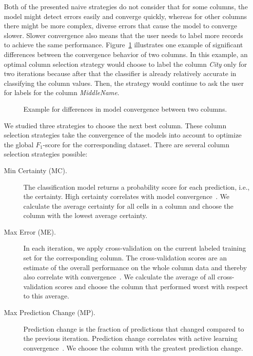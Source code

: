 Both of the presented naive strategies do not consider that for some columns, the model might detect errors easily and converge quickly, whereas for other columns there might be more complex, diverse errors that cause the model to converge slower. Slower convergence also means that the user needs to label more records to achieve the same performance. Figure~\ref{fig:column_progress} illustrates one example of significant differences between the convergence behavior of two columns. In this example, an optimal column selection strategy would choose to label the column \emph{City} only for two iterations because after that the classifier is already relatively accurate in classifying the column values. Then, the strategy would continue to ask the user for labels for the column \emph{MiddleName}.

\begin{figure}[H]
\centering

\caption{Example for differences in model convergence between two columns.} 
\label{fig:column_progress}
\end{figure}

We studied three strategies to choose the next best column. These column selection strategies take the convergence of the models into account to optimize the global $F_1$-score for the corresponding dataset.
There are several column selection strategies possible:

\begin{description}
  \item[Min Certainty (MC).] The classification model returns a probability score for each prediction, i.e., the certainty. High certainty correlates with model convergence~\cite{zhu2007active}. We calculate the average certainty for all cells in a column and choose the column with the lowest average certainty. 
  \item[Max Error (ME).] In each iteration, we apply cross-validation on the current labeled training set for the corresponding column. The cross-validation scores are an estimate of the overall performance on the whole column data and thereby also correlate with convergence~\cite{zhu2007active}. We calculate the average of all cross-validation scores and choose the column that performed worst with respect to this average.
  \item[Max Prediction Change (MP).] Prediction change is the fraction of predictions that changed compared to the previous iteration. Prediction change correlates with active learning convergence~\cite{bloodgood2009method}. We choose the column with the greatest prediction change.
\end{description}


